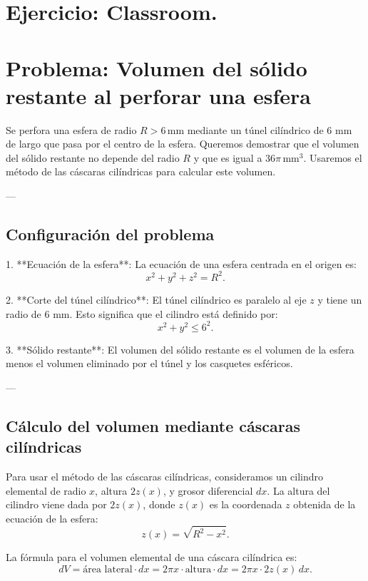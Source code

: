 \documentclass[11pt,letterpaper]{article}
\begin{document}
\section{Ejercicio: Classroom.}
\section*{Problema: Volumen del sólido restante al perforar una esfera}

Se perfora una esfera de radio \( R > 6 \, \mathrm{mm} \) mediante un túnel cilíndrico de 6 mm de largo que pasa por el centro de la esfera. Queremos demostrar que el volumen del sólido restante no depende del radio \( R \) y que es igual a \( 36\pi \, \mathrm{mm}^3 \). Usaremos el método de las cáscaras cilíndricas para calcular este volumen.

---

\subsection*{Configuración del problema}

1. **Ecuación de la esfera**: 
 La ecuación de una esfera centrada en el origen es:
 \[
 x^2 + y^2 + z^2 = R^2.
 \]

2. **Corte del túnel cilíndrico**: 
 El túnel cilíndrico es paralelo al eje \(z\) y tiene un radio de 6 mm. Esto significa que el cilindro está definido por:
 \[
 x^2 + y^2 \leq 6^2.
 \]

3. **Sólido restante**: 
 El volumen del sólido restante es el volumen de la esfera menos el volumen eliminado por el túnel y los casquetes esféricos.

---

\subsection*{Cálculo del volumen mediante cáscaras cilíndricas}

Para usar el método de las cáscaras cilíndricas, consideramos un cilindro elemental de radio \(x\), altura \(2z(x)\), y grosor diferencial \(dx\). La altura del cilindro viene dada por \(2z(x)\), donde \(z(x)\) es la coordenada \(z\) obtenida de la ecuación de la esfera:
\[
z(x) = \sqrt{R^2 - x^2}.
\]

La fórmula para el volumen elemental de una cáscara cilíndrica es:
\[
dV = \text{área lateral} \cdot dx = 2\pi x \cdot \text{altura} \cdot dx = 2\pi x \cdot 2z(x) \, dx.
\]
\end{document}
